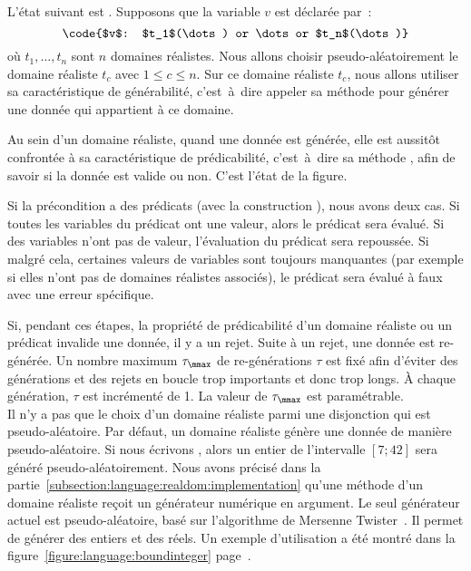 L'état suivant est . Supposons que la variable $v$ est déclarée
par~:
%
$$\code{$v$: $t_1$(\dots) or \dots or $t_n$(\dots)}$$
%
où $t_1, \dots, t_n$ sont $n$ domaines réalistes. Nous allons choisir
pseudo-aléatoirement le domaine réaliste $t_c$ avec $1 \leq c \leq n$. Sur ce
domaine réaliste $t_c$, nous allons utiliser sa caractéristique de générabilité,
c'est~à~dire appeler sa méthode  pour générer une donnée qui
appartient à ce domaine.

Au sein d'un domaine réaliste, quand une donnée est générée, elle est aussitôt
confrontée à sa caractéristique de prédicabilité, c'est~à~dire sa méthode
, afin de savoir si la donnée est valide ou non. C'est l'état
 de la figure.

Si la précondition a des prédicats (avec la construction ), nous avons
deux cas. Si toutes les variables du prédicat ont une valeur, alors le prédicat
sera évalué. Si des variables n'ont pas de valeur, l'évaluation du prédicat sera
repoussée. Si malgré cela, certaines valeurs de variables sont toujours
manquantes (par exemple si elles n'ont pas de domaines réalistes associés), le
prédicat sera évalué à faux avec une erreur spécifique.

Si, pendant ces étapes, la propriété de prédicabilité d'un domaine réaliste ou
un prédicat invalide une donnée, il y a un {\strong rejet}. Suite à un rejet,
une donnée est re-générée. Un nombre maximum $\tau_{\mmax}$ de re-générations
$\tau$ est fixé afin d'éviter des générations et des rejets en boucle trop
importants et donc trop longs. À chaque génération, $\tau$ est incrémenté de 1.
La valeur de $\tau_{\mmax}$ est paramétrable. \\

Il n'y a pas que le choix d'un domaine réaliste parmi une disjonction qui est
pseudo-aléatoire. Par défaut, un domaine réaliste génère une donnée de manière
pseudo-aléatoire. Si nous écrivons , alors un entier
de l'intervalle $[7; 42]$ sera généré pseudo-aléatoirement. Nous avons précisé
dans la partie~\ref{subsection:language:realdom:implementation} qu'une méthode
 d'un domaine réaliste reçoit un générateur numérique en argument.
Le seul générateur actuel est pseudo-aléatoire, basé sur l'algorithme de
Mersenne Twister~. Il permet de générer des entiers et des
réels. Un exemple d'utilisation a été montré dans la
figure~\ref{figure:language:boundinteger}
page~\pageref{figure:language:boundinteger}.

